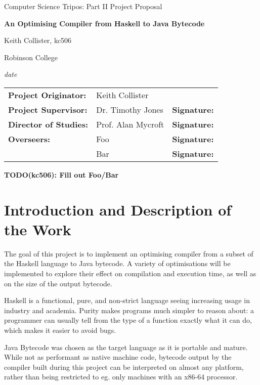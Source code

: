 \documentclass[12pt]{article}
\newcommand\todo[1]{\textbf{TODO(kc506): #1}}
\begin{document}
\thispagestyle{empty}

\centerline{\large Computer Science Tripos: Part II Project Proposal}
\vspace{0.4in}
\centerline{\Large\bf An Optimising Compiler from Haskell to Java Bytecode}
\vspace{0.3in}

\centerline{Keith Collister, kc506}
\centerline{Robinson College}

\centerline{\large \emph{date}}

\vspace{1in}

\begin{tabular}{ p{4cm} p{4.5cm} l }
{\bf Project Originator:} & Keith Collister & \\[3mm]
{\bf Project Supervisor:} & Dr. Timothy Jones & {\bf Signature:} \\[3mm]
{\bf Director of Studies:} & Prof. Alan Mycroft & {\bf Signature:} \\[3mm]
{\bf Overseers:} & Foo & {\bf Signature:} \\[3mm]
                 & Bar & {\bf Signature:} \\[3mm]
\end{tabular}

\todo{Fill out Foo/Bar}

\vspace{0.75in}



\section*{Introduction and Description of the Work}

The goal of this project is to implement an optimising compiler from a subset of the Haskell language to Java bytecode.
A variety of optimisations will be implemented to explore their effect on compilation and execution time, as well as on
the size of the output bytecode.

Haskell is a functional, pure, and non-strict language seeing increasing usage in industry and academia. Purity makes
programs much simpler to reason about: a programmer can usually tell from the type of a function exactly what it can do,
which makes it easier to avoid bugs.

Java Bytecode was chosen as the target language as it is portable and mature. While not as performant as native machine
code, bytecode output by the compiler built during this project can be interpreted on almost any platform, rather than
being restricted to eg. only machines with an x86-64 processor.
\end{document}

